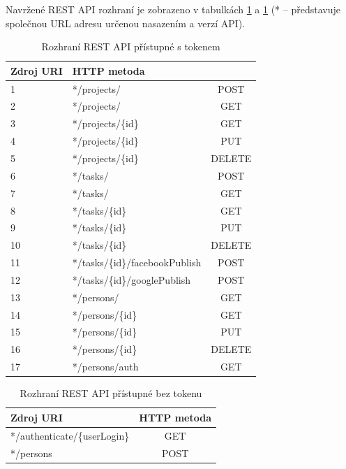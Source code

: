 \documentclass[thesis=B,czech]{FITthesis}[2012/06/26]
\begin{document}
Navržené REST API rozhraní je zobrazeno v tabulkách \ref{tab:RESTfulAPI_rozhrani_s} a \ref{tab:RESTfulAPI_rozhrani_s} (* -- představuje společnou URL adresu určenou nasazením a verzí API).

\begin{table}\centering
\caption{Rozhraní REST API přístupné s tokenem}\label{tab:RESTfulAPI_rozhrani_s}
	\begin{tabular}[t]{l l c}
		\toprule
		\textbf{Zdroj URI} & \textbf{HTTP metoda}\\ \midrule \midrule
		1&*/projects/ & POST \\ \midrule
		2&*/projects/ & GET \\ \midrule
		3&*/projects/\{id\} & GET \\ \midrule
		4&*/projects/\{id\} & PUT \\ \midrule
		5&*/projects/\{id\} & DELETE \\ \midrule  
		6&*/tasks/ & POST \\ \midrule
		7&*/tasks/ & GET \\ \midrule
		8&*/tasks/\{id\} & GET \\ \midrule
		9&*/tasks/\{id\} & PUT \\ \midrule
		10&*/tasks/\{id\} & DELETE \\ \midrule       
		11&*/tasks/\{id\}/facebookPublish & POST \\ \midrule
		12&*/tasks/\{id\}/googlePublish & POST \\ \midrule
		13&*/persons/ & GET \\ \midrule
		14&*/persons/\{id\} & GET \\ \midrule
		15&*/persons/\{id\} & PUT \\ \midrule
		16&*/persons/\{id\} & DELETE \\ \midrule  	
		17&*/persons/auth & GET \\ \midrule  				
	\end{tabular}
\end{table}

\begin{table}\centering
	\caption{Rozhraní REST API přístupné bez tokenu}\label{tab:RESTfulAPI_rozhrani_bez}
	\begin{tabular}{l c}
		\toprule
		\textbf{Zdroj URI} & \textbf{HTTP metoda}\\ \midrule \midrule
		*/authenticate/\{userLogin\} & GET \\ \midrule
		*/persons & POST \\ \midrule
	\end{tabular}
\end{table}
\end{document}
